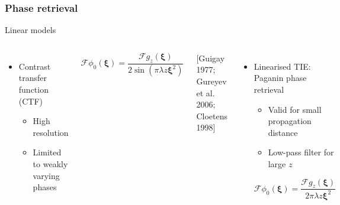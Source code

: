 \documentclass{beamer}
\newcommand{\reff}[1]{\begin{flushright}\scriptsize [#1]\end{flushright}}
\renewcommand{\vec}{\mathbold}
\newcommand{\vecxi}{\vec{\xi}}
\newcommand{\F}{\mathcal{F}}
\begin{document}
\begin{frame}
  \frametitle{Phase retrieval}
  Linear models

  \begin{columns}
    \begin{itemize}
    \item Contrast transfer function (CTF)
      \begin{itemize}
      \item High resolution
      \item Limited to weakly varying phases
      \end{itemize}
    \end{itemize}

    \begin{equation*}
      \F\phi_0(\vecxi) = \frac{\F g_z(\vecxi) }{2\sin(\pi\lambda z\vecxi^2)}
    \end{equation*}
    \reff{Guigay 1977; Gureyev et al. 2006; Cloetens 1998}
    \vfill
    \begin{itemize}
    \item Linearised TIE: Paganin phase retrieval
      \begin{itemize}
      \item Valid for small propagation distance
      \item Low-pass filter for large $z$
      \end{itemize}

      \begin{equation*}
        \F\phi_0(\vecxi) = \frac{\F g_z(\vecxi) }{2\pi\lambda z\vecxi^2}
      \end{equation*}
    \end{itemize}
  \end{columns}
\end{frame}
\end{document}
